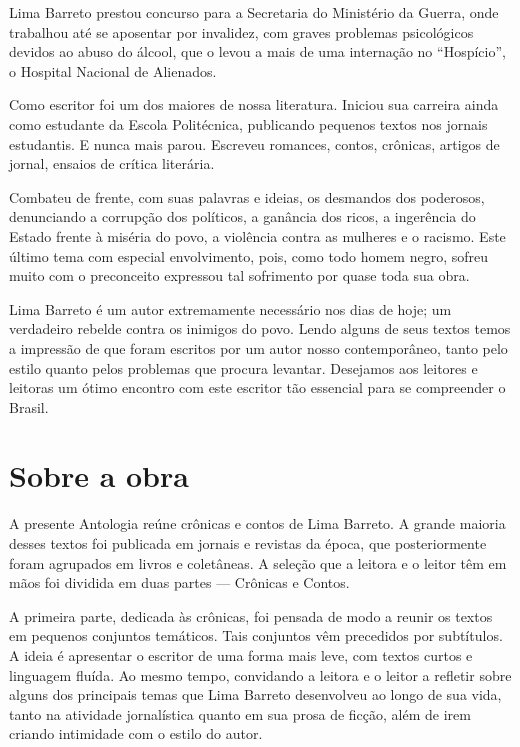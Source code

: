 Lima Barreto prestou concurso para a Secretaria do Ministério da Guerra,
onde trabalhou até se aposentar por invalidez, com graves problemas
psicológicos devidos ao abuso do álcool, que o levou a mais de uma
internação no ``Hospício'', o Hospital Nacional de Alienados.

Como escritor foi um dos maiores de nossa literatura. Iniciou sua
carreira ainda como estudante da Escola Politécnica, publicando pequenos
textos nos jornais estudantis. E nunca mais parou. Escreveu romances,
contos, crônicas, artigos de jornal, ensaios de crítica literária.

Combateu de frente, com suas palavras e ideias, os desmandos dos
poderosos, denunciando a corrupção dos políticos, a ganância dos ricos,
a ingerência do Estado frente à miséria do povo, a violência contra as
mulheres e o racismo. Este último tema com especial envolvimento, pois,
como todo homem negro, sofreu muito com o preconceito expressou tal
sofrimento por quase toda sua obra.

Lima Barreto é um autor extremamente necessário nos dias de hoje; um
verdadeiro rebelde contra os inimigos do povo. Lendo alguns de seus
textos temos a impressão de que foram escritos por um autor nosso
contemporâneo, tanto pelo estilo quanto pelos problemas que procura
levantar. Desejamos aos leitores e leitoras um ótimo encontro com este
escritor tão essencial para se compreender o Brasil.

\section{Sobre a obra}

A presente Antologia reúne crônicas e contos de Lima Barreto. A grande
maioria desses textos foi publicada em jornais e revistas da época, que
posteriormente foram agrupados em livros e coletâneas. A seleção que a
leitora e o leitor têm em mãos foi dividida em duas partes --- Crônicas e
Contos.

A primeira parte, dedicada às crônicas, foi pensada de modo a reunir os
textos em pequenos conjuntos temáticos. Tais conjuntos vêm precedidos
por subtítulos. A ideia é apresentar o escritor de uma forma mais leve,
com textos curtos e linguagem fluída. Ao mesmo tempo, convidando a
leitora e o leitor a refletir sobre alguns dos principais temas que Lima
Barreto desenvolveu ao longo de sua vida, tanto na atividade
jornalística quanto em sua prosa de ficção, além de irem criando
intimidade com o estilo do autor.

